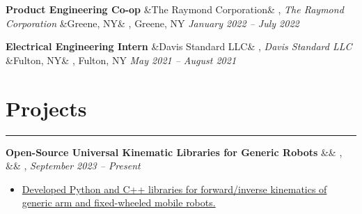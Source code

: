 \documentclass[letterpaper,10pt]{article}
\newcommand{\heading}[1]{%
    \vspace{-5mm} %
    \section*{#1}%
    \vspace{-3mm}%
    \noindent\hrule height 0.5pt %
    \vspace{4mm}%
}
\newcommand{\experience}[5]{%
    \vspace{-1mm}%
    \noindent\textbf{#1}%
    \ifx&#2&
    \else
        , \textit{#2}%
    \fi
    \ifx&#3&
    \else
        , #3%
    \fi
    \hfill \textit{#4} \\
    \vspace{-6.8mm}%
    \begin{itemize}[itemsep=-5pt]
        \setlength{\itemindent}{0em}
        #5
    \end{itemize}
}
\newcommand{\blankexperience}[5]{%
    \vspace{-1mm}%
    \noindent\textbf{#1}%
    \ifx&#2&
    \else
        , \textit{#2}%
    \fi
    \ifx&#3&
    \else
        , #3%
    \fi
    \hfill \textit{#4} \\
    \vspace{-1.5mm}%
}
\begin{document}
\blankexperience
    {Product Engineering Co-op}
    {The Raymond Corporation}
    {Greene, NY}
    {January 2022 – July 2022}
    {
        


    }

\blankexperience
    {Electrical Engineering Intern}
    {Davis Standard LLC}
    {Fulton, NY}
    {May 2021 – August 2021}
    {
        

    }
    


\vspace{-0.5em}
\heading{Projects}

    
\experience
    {Open-Source Universal Kinematic Libraries for Generic Robots}
    {}
    {}
    {September 2023 – Present}
    {
        \item \href{https://ryanbarry.me/projects/robotics/kinematics/}{Developed Python and C++ libraries for forward/inverse kinematics of generic arm and fixed-wheeled mobile robots.}
        
    }
    
\end{document}
